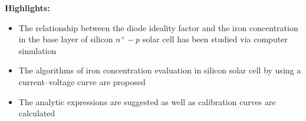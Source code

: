 \documentclass[preprint]{elsarticle}
\begin{document}
\textbf{Highlights:}

\begin{itemize}
  \item The relationship between the diode ideality factor and the iron concentration in the base layer of silicon $n^+-p$ solar cell has been studied via computer simulation
  \item The algorithms of iron concentration evaluation in silicon solar cell by using a current--voltage curve are proposed
  \item The analytic expressions are suggested as well as calibration curves are calculated
\end{itemize}
\end{document}
